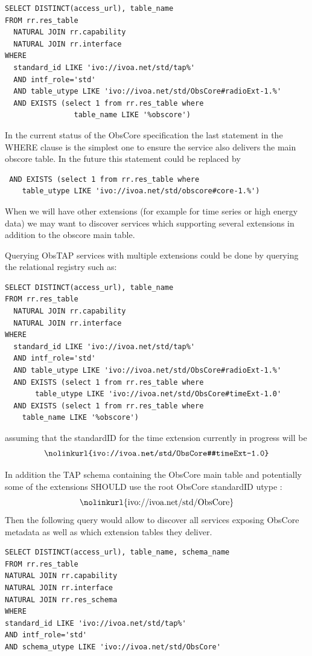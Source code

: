 \documentclass[11pt,a4paper]{ivoa}
\begin{document}
\begin{lstlisting}
SELECT DISTINCT(access_url), table_name
FROM rr.res_table
  NATURAL JOIN rr.capability
  NATURAL JOIN rr.interface
WHERE
  standard_id LIKE 'ivo://ivoa.net/std/tap%'
  AND intf_role='std'
  AND table_utype LIKE 'ivo://ivoa.net/std/ObsCore#radioExt-1.%'
  AND EXISTS (select 1 from rr.res_table where
    			table_name LIKE '%obscore')
\end{lstlisting}

In the current status of the ObsCore specification the last statement in the WHERE clause
is the simplest one to ensure the service also delivers the main obscore table. 
In the future  this statement could be replaced   by 
\begin{lstlisting}
 AND EXISTS (select 1 from rr.res_table where
    table_utype LIKE 'ivo://ivoa.net/std/obscore#core-1.%')
\end{lstlisting}
 
When we will have other extensions (for example for time series or high energy data) we may want to 
discover services which supporting  several extensions in addition to the obscore 
main table.

Querying ObsTAP services with multiple extensions could be done by querying the relational registry  such as:  

\begin{lstlisting}
SELECT DISTINCT(access_url), table_name
FROM rr.res_table
  NATURAL JOIN rr.capability
  NATURAL JOIN rr.interface
WHERE
  standard_id LIKE 'ivo://ivoa.net/std/tap%'
  AND intf_role='std'
  AND table_utype LIKE 'ivo://ivoa.net/std/ObsCore#radioExt-1.%'
  AND EXISTS (select 1 from rr.res_table where 
       table_utype LIKE 'ivo://ivoa.net/std/ObsCore#timeExt-1.0'
  AND EXISTS (select 1 from rr.res_table where
    table_name LIKE '%obscore')
\end{lstlisting}

assuming that the standardID for the time extension currently in progress will be 
$$
\hbox{\nolinkurl{ivo://ivoa.net/std/ObsCore#timeExt-1.0}}
$$

In addition the TAP schema containing the ObsCore main table and potentially some of the  extensions
SHOULD use the root ObsCore standardID utype :
$$
\hbox{\nolinkurl{ivo://ivoa.net/std/ObsCore}}
$$
Then the following query would allow to discover all services exposing ObsCore metadata as well as  which extension tables they deliver.

\begin{lstlisting}
SELECT DISTINCT(access_url), table_name, schema_name
FROM rr.res_table
NATURAL JOIN rr.capability
NATURAL JOIN rr.interface
NATURAL JOIN rr.res_schema
WHERE
standard_id LIKE 'ivo://ivoa.net/std/tap%'
AND intf_role='std'
AND schema_utype LIKE 'ivo://ivoa.net/std/ObsCore'
\end{lstlisting}

\newpage
\appendix





\end{document}
